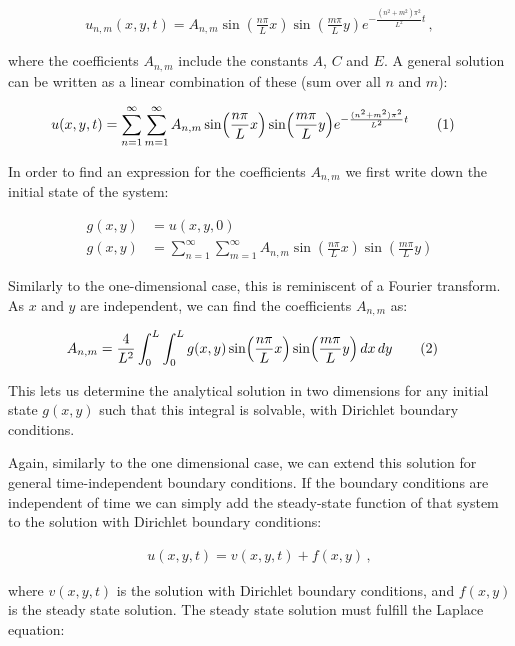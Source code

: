 \documentclass[reprint,english,notitlepage]{revtex4-1}  %
\newcommand\numberthis{\addtocounter{equation}{1}\tag{\theequation}}
\begin{document}
\begin{align*}
u_{n,m}(x,y,t) = A_{n,m} \sin (\frac{n\pi}{L} x)  \sin (\frac{m\pi}{L} y) e^{-\frac{(n^2 + m^2)\pi^2}{L^2} t} \, ,
\end{align*}

where the coefficients $A_{n,m}$ include the constants $A$, $C$ and $E$. A general solution can be written as a linear combination of these (sum over all $n$ and $m$):

\begin{align*}
u(x,y,t) &= \sum\limits_{n=1}^\infty \sum\limits_{m=1}^\infty A_{n,m} \sin (\frac{n\pi}{L} x)  \sin (\frac{m\pi}{L} y) e^{-\frac{(n^2 + m^2)\pi^2}{L^2} t} \numberthis \label{eq:2D_diffusion_equation_analytical_solution}
\end{align*} 

In order to find an expression for the coefficients $A_{n,m}$ we first write down the initial state of the system:

\begin{align*}
g(x,y) &= u(x,y,0) \\
g(x,y) &= \sum\limits_{n=1}^\infty \sum\limits_{m=1}^\infty A_{n,m} \sin (\frac{n\pi}{L} x)  \sin (\frac{m\pi}{L} y)
\end{align*}

Similarly to the one-dimensional case, this is reminiscent of a Fourier transform. As $x$ and $y$ are independent, we can find the coefficients $A_{n,m}$ as:

\begin{align*}
A_{n,m} &= \frac{4}{L^2} \int_0^L \int_0^L g(x,y) \sin( \frac{n\pi}{L} x) \sin (\frac{m\pi}{L} y) \, dx \, dy \numberthis \label{eq:2D_diffusion_equation_analytical_coefficients}
\end{align*}

This lets us determine the analytical solution in two dimensions for any initial state $g(x,y)$ such that this integral is solvable, with Dirichlet boundary conditions.

Again, similarly to the one dimensional case, we can extend this solution for general time-independent boundary conditions. If the boundary conditions are independent of time we can simply add the steady-state function of that system to the solution with Dirichlet boundary conditions:

\begin{align*}
u(x,y,t) = v(x,y,t) + f(x,y) \, ,
\end{align*}

where $v(x,y,t)$ is the solution with Dirichlet boundary conditions, and $f(x,y)$ is the steady state solution. The steady state solution must fulfill the Laplace equation:
\end{document}
